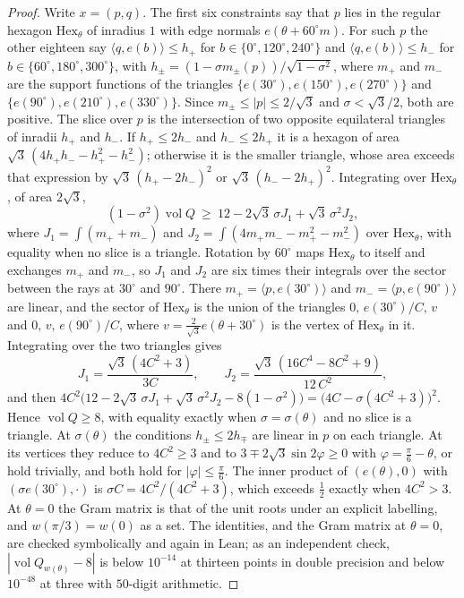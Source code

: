 \documentclass[11pt,reqno]{amsart}
\renewcommand{\_}{\origunderscore\allowbreak}
\numberwithin{equation}{section}
\theoremstyle{plain}
\theoremstyle{definition}
\theoremstyle{remark}
\DeclareMathOperator{\vol}{vol}
\begin{document}
\begin{proof}
Write $x=(p,q)$. The first six constraints say that $p$ lies in the regular
hexagon $\mathrm{Hex}_\theta$ of inradius $1$ with edge normals
$e(\theta+60^\circ m)$. For such $p$ the other eighteen say
$\langle q,e(b)\rangle\le h_+$ for $b\in\{0^\circ,120^\circ,240^\circ\}$ and
$\langle q,e(b)\rangle\le h_-$ for $b\in\{60^\circ,180^\circ,300^\circ\}$, with
$h_\pm=(1-\sigma m_\pm(p))/\sqrt{1-\sigma^2}$, where $m_+$ and $m_-$ are the
support functions of the triangles $\{e(30^\circ),e(150^\circ),e(270^\circ)\}$
and $\{e(90^\circ),e(210^\circ),e(330^\circ)\}$. Since $m_\pm\le|p|\le2/\sqrt3$
and $\sigma<\sqrt3/2$, both are positive. The slice over $p$ is the
intersection of two opposite equilateral triangles of inradii $h_+$ and
$h_-$. If $h_+\le2h_-$ and $h_-\le2h_+$ it is a hexagon of area
$\sqrt3\,(4h_+h_--h_+^2-h_-^2)$; otherwise it is the smaller triangle, whose area
exceeds that expression by $\sqrt3\,(h_+-2h_-)^2$ or $\sqrt3\,(h_--2h_+)^2$.
Integrating over $\mathrm{Hex}_\theta$, of area $2\sqrt3$,
\[
  (1-\sigma^2)\vol Q\ \ge\ 12-2\sqrt3\,\sigma J_1+\sqrt3\,\sigma^2J_2,
\]
where $J_1=\int(m_++m_-)$ and $J_2=\int(4m_+m_--m_+^2-m_-^2)$ over
$\mathrm{Hex}_\theta$, with equality when no slice is a triangle. Rotation by $60^\circ$ maps
$\mathrm{Hex}_\theta$ to itself and exchanges $m_+$ and $m_-$, so $J_1$
and $J_2$ are six times their integrals over the sector between the rays at
$30^\circ$ and $90^\circ$. There $m_+=\langle p,e(30^\circ)\rangle$ and
$m_-=\langle p,e(90^\circ)\rangle$ are linear, and the sector of
$\mathrm{Hex}_\theta$ is the union of the triangles $0,\,e(30^\circ)/C,\,v$ and
$0,\,v,\,e(90^\circ)/C$, where $v=\frac{2}{\sqrt3}e(\theta+30^\circ)$ is the vertex
of $\mathrm{Hex}_\theta$ in it. Integrating over the two triangles gives
\[
  J_1=\frac{\sqrt3\,(4C^2+3)}{3C},\qquad J_2=\frac{\sqrt3\,(16C^4-8C^2+9)}{12\,C^2},
\]
and then
$4C^2\bigl(12-2\sqrt3\,\sigma J_1+\sqrt3\,\sigma^2J_2-8(1-\sigma^2)\bigr)
=\bigl(4C-\sigma(4C^2+3)\bigr)^2$. Hence $\vol Q\ge8$, with equality exactly
when $\sigma=\sigma(\theta)$ and no slice is a triangle. At $\sigma(\theta)$ the
conditions $h_\pm\le2h_\mp$ are linear in $p$ on each triangle. At its
vertices they reduce to $4C^2\ge3$ and to
$3\mp2\sqrt3\sin2\varphi\ge0$ with $\varphi=\frac\pi6-\theta$, or hold
trivially, and both hold for $|\varphi|\le\frac\pi6$. The inner product of
$(e(\theta),0)$ with $(\sigma e(30^\circ),\cdot)$ is
$\sigma C=4C^2/(4C^2+3)$, which exceeds $\frac12$ exactly when $4C^2>3$. At
$\theta=0$ the Gram matrix is that of the unit roots under an explicit
labelling, and $w(\pi/3)=w(0)$ as a set. The identities, and the Gram
matrix at $\theta=0$, are checked symbolically and again in Lean; as an
independent check, $|\vol Q_{w(\theta)}-8|$ is below $10^{-14}$ at thirteen
points in double precision and below $10^{-48}$ at three with $50$-digit
arithmetic.
\end{proof}
\end{document}
